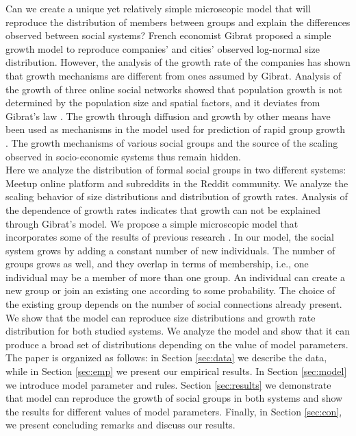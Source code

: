 Can we create a unique yet relatively simple microscopic model that will reproduce the distribution of members between groups and explain the differences observed between social systems? French economist Gibrat proposed a simple growth model to reproduce companies' and cities' observed log-normal size distribution. However, the analysis of the growth rate of the companies \cite{amaral1997scaling} has shown that growth mechanisms are different from ones assumed by Gibrat. Analysis of the growth of three online social networks showed that population growth is not determined by the population size and spatial factors, and it deviates from Gibrat's law \cite{zhu2014online}. The growth through diffusion and growth by other means have been used as mechanisms in the model used for prediction of rapid group growth \cite{kairam2012life}. The growth mechanisms of various social groups and the source of the scaling observed in socio-economic systems thus remain hidden.\\

Here we analyze the distribution of formal social groups in two different systems: Meetup online platform and subreddits in the Reddit community. We analyze the scaling behavior of size distributions and distribution of growth rates. Analysis of the dependence of growth rates indicates that growth can not be explained through Gibrat's model. We propose a simple microscopic model that incorporates some of the results of previous research \cite{backstrom2006group}. In our model, the social system grows by adding a constant number of new individuals. The number of groups grows as well, and they overlap in terms of membership, i.e., one individual may be a member of more than one group. An individual can create a new group or join an existing one according to some probability. The choice of the existing group depends on the number of social connections already present. We show that the model can reproduce size distributions and growth rate distribution for both studied systems. We analyze the model and show that it can produce a broad set of distributions depending on the value of model parameters.\\

The paper is organized as follows: in Section \ref{sec:data} we describe the data, while in Section \ref{sec:emp} we present our empirical results. In Section \ref{sec:model} we introduce model parameter and rules. Section \ref{sec:results} we demonstrate that model can reproduce the growth of social groups in both systems and show the results for different values of model parameters. Finally, in Section \ref{sec:con}, we present concluding remarks and discuss our results. 



